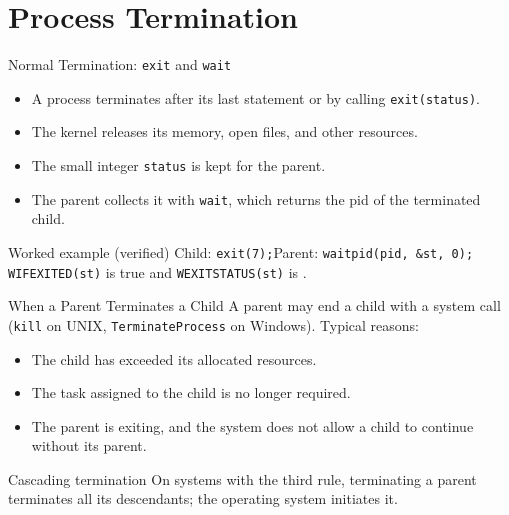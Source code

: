 \documentclass[aspectratio=169]{beamer}
\begin{document}
\section{Process Termination}

\begin{frame}{Normal Termination: \texttt{exit} and \texttt{wait}}
  \begin{itemize}
    \item A process terminates after its last statement or by calling
      \texttt{exit(status)}.
    \item The kernel releases its memory, open files, and other resources.
    \item The small integer \texttt{status} is kept for the parent.
    \item The parent collects it with \texttt{wait}, which returns the pid of
      the terminated child.
  \end{itemize}
  \vspace{0.2cm}
  \begin{exampleblock}{Worked example (verified)}
    Child: \texttt{exit(7);}\quad Parent: \texttt{waitpid(pid, \&st, 0);}\\
    \texttt{WIFEXITED(st)} is true and \texttt{WEXITSTATUS(st)} is .
  \end{exampleblock}
\end{frame}

\begin{frame}{When a Parent Terminates a Child}
  A parent may end a child with a system call (\texttt{kill} on UNIX,
  \texttt{TerminateProcess} on Windows). Typical reasons:
  \vspace{0.15cm}
  \begin{itemize}
    \item The child has exceeded its allocated resources.
    \item The task assigned to the child is no longer required.
    \item The parent is exiting, and the system does not allow a child to
      continue without its parent.
  \end{itemize}
  \vspace{0.2cm}
  \begin{block}{Cascading termination}
    On systems with the third rule, terminating a parent terminates all its
    descendants; the operating system initiates it.
  \end{block}
\end{frame}
\end{document}
